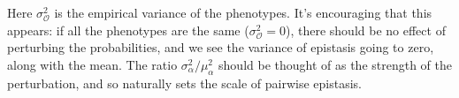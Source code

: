 \documentclass[12pt]{article}
\def\be{\begin{equation}}
\def\ee{\end{equation}}
\def\O{\mathcal{O}}
\begin{document}
\noindent Here $\sigma^2_{\O}$ is the empirical variance of the phenotypes.  It's encouraging that this appears: if all the phenotypes are the same ($\sigma^2_{\O}=0$), there should be no effect of perturbing the probabilities, and we see the variance of epistasis going to zero, along with the mean.  The ratio $\sigma^2_{\alpha}/\mu^2_{\alpha}$ should be thought of as the strength of the perturbation, and so naturally sets the scale of pairwise epistasis.










\end{document}
